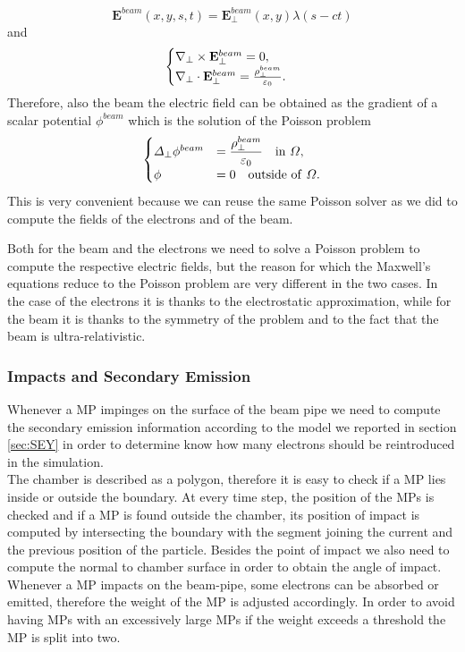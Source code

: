 $$\mathbf{E}^{beam}(x, y, s, t) = \mathbf{E}_\perp^{beam}(x, y) \lambda(s - ct)$$
and
\begin{equation*}
    \begin{cases}
        \nabla_{\perp} \times \mathbf{E}^{beam}_\perp = 0,\\
        \nabla_{\perp} \cdot \mathbf{E}^{beam}_\perp = \frac{\rho_\perp^{beam}}{\varepsilon_0}.
    \end{cases}
\end{equation*}
Therefore, also the beam the electric field can be obtained as the gradient of a scalar potential $\phi^{beam}$ which is the solution of the Poisson problem
\begin{align*}
    \begin{cases}
        \Delta_{\perp} \phi^{beam}&= \dfrac{\rho_\perp^{beam}}{\varepsilon_0} \quad \mathrm{in} \ \Omega,\\
        \phi&= 0 \quad \mathrm{outside} \ \mathrm{of} \ \Omega.
    \end{cases}
\end{align*}
This is very convenient because we can reuse the same Poisson solver as we did to compute the fields of the electrons and of the beam.\\
\begin{Remark}
Both for the beam and the electrons we need to solve a Poisson problem to compute the respective electric fields, but the reason for which the Maxwell's equations reduce to the Poisson problem are very different in the two cases. In the case of the electrons it is thanks to the electrostatic approximation, while for the beam it is thanks to the symmetry of the problem and to the fact that the beam is ultra-relativistic.
\end{Remark}

\subsubsection{Impacts and Secondary Emission}
Whenever a MP impinges on the surface of the beam pipe we need to compute the secondary emission information according to the model we reported in section \ref{sec:SEY} in order to determine know how many electrons should be reintroduced in the simulation.\\
The chamber is described as a polygon, therefore it is easy to check if a MP lies inside or outside the boundary. At every time step, the position of the MPs is checked and if a MP is found outside the chamber, its position of impact is computed by intersecting the boundary with the segment joining the current and the previous position of the particle. Besides the point of impact we also need to compute the normal to chamber surface in order to obtain the angle of impact.
Whenever a MP impacts on the beam-pipe, some electrons can be absorbed or emitted, therefore the weight of the MP is adjusted accordingly. In order to avoid having MPs with an excessively large MPs if the weight exceeds a threshold the MP is split into two.
